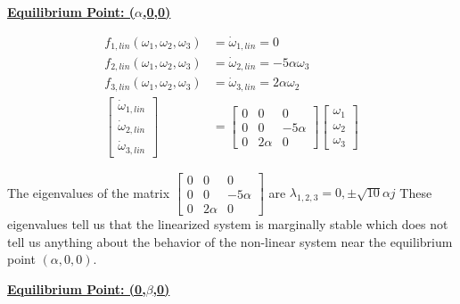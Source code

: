 \documentclass{article}
\begin{document}
  \textbf{\underline{Equilibrium Point: ($\alpha$,\hspace{0.8mm}0,\hspace{0.8mm}0)}}

  \begin{align*}
    f_{1, lin}(\omega_1,\omega_2, \omega_3) &= \dot{\omega}_{1,lin} = 0 \\
    f_{2, lin}(\omega_1,\omega_2, \omega_3) &= \dot{\omega}_{2,lin} =  -5\alpha\omega_3 \\
    f_{3, lin}(\omega_1,\omega_2, \omega_3) &= \dot{\omega}_{3,lin} = 2\alpha\omega_2 \\
    \begin{bmatrix}
      \dot{\omega}_{1,lin} \\
      \dot{\omega}_{2,lin} \\
      \dot{\omega}_{3,lin}
    \end{bmatrix} &=
    \begin{bmatrix}
      0 & 0 & 0 \\
      0 & 0 & -5\alpha \\
      0 & 2\alpha & 0
    \end{bmatrix}
    \begin{bmatrix}
      \omega_1 \\
      \omega_2 \\
      \omega_3
    \end{bmatrix}
  \end{align*}
    
  \noindent The eigenvalues of the matrix 
  $\begin{bmatrix}
    0 & 0 & 0 \\
    0 & 0 & -5\alpha \\
    0 & 2\alpha & 0
  \end{bmatrix}$
  are $\lambda_{1,2,3} = 0, \pm \sqrt{10}\alpha j$ \vspace{3.0mm}
  These eigenvalues tell us that the linearized system is marginally stable
  which does not tell us anything about the behavior of the non-linear system
  near the equilibrium point $(\alpha, 0, 0)$. \newpage
    
  \textbf{\underline{Equilibrium Point: (0,\hspace{0.8mm}$\beta$,\hspace{0.8mm}0)}}
\end{document}
